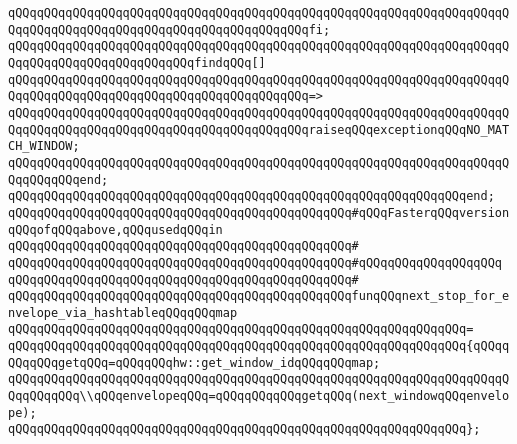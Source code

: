 \verb|qQQqqQQqqQQqqQQqqQQqqQQqqQQqqQQqqQQqqQQqqQQqqQQqqQQqqQQqqQQqqQQqqQQqqQQqqQQqqQQqqQQqqQQqqQQqqQQqqQQqqQQqqQQqqQQqfi;|\newline
\newline
\verb|qQQqqQQqqQQqqQQqqQQqqQQqqQQqqQQqqQQqqQQqqQQqqQQqqQQqqQQqqQQqqQQqqQQqqQQqqQQqqQQqqQQqqQQqqQQqqQQqfindqQQq[]|\newline
\verb|qQQqqQQqqQQqqQQqqQQqqQQqqQQqqQQqqQQqqQQqqQQqqQQqqQQqqQQqqQQqqQQqqQQqqQQqqQQqqQQqqQQqqQQqqQQqqQQqqQQqqQQqqQQqqQQq=>|\newline
\verb|qQQqqQQqqQQqqQQqqQQqqQQqqQQqqQQqqQQqqQQqqQQqqQQqqQQqqQQqqQQqqQQqqQQqqQQqqQQqqQQqqQQqqQQqqQQqqQQqqQQqqQQqqQQqqQQqraiseqQQqexceptionqQQqNO_MATCH_WINDOW;|\newline
\verb|qQQqqQQqqQQqqQQqqQQqqQQqqQQqqQQqqQQqqQQqqQQqqQQqqQQqqQQqqQQqqQQqqQQqqQQqqQQqqQQqend;|\newline
\verb|qQQqqQQqqQQqqQQqqQQqqQQqqQQqqQQqqQQqqQQqqQQqqQQqqQQqqQQqqQQqqQQqend;|\newline
\newline
\verb|qQQqqQQqqQQqqQQqqQQqqQQqqQQqqQQqqQQqqQQqqQQqqQQq#qQQqFasterqQQqversionqQQqofqQQqabove,qQQqusedqQQqin|\newline
\verb|qQQqqQQqqQQqqQQqqQQqqQQqqQQqqQQqqQQqqQQqqQQqqQQq#|\newline
\verb|qQQqqQQqqQQqqQQqqQQqqQQqqQQqqQQqqQQqqQQqqQQqqQQq#qQQqqQQqqQQqqQQqqQQq|\newline
\verb|qQQqqQQqqQQqqQQqqQQqqQQqqQQqqQQqqQQqqQQqqQQqqQQq#|\newline
\verb|qQQqqQQqqQQqqQQqqQQqqQQqqQQqqQQqqQQqqQQqqQQqqQQqfunqQQqnext_stop_for_envelope_via_hashtableqQQqqQQqmap|\newline
\verb|qQQqqQQqqQQqqQQqqQQqqQQqqQQqqQQqqQQqqQQqqQQqqQQqqQQqqQQqqQQqqQQq=|\newline
\verb|qQQqqQQqqQQqqQQqqQQqqQQqqQQqqQQqqQQqqQQqqQQqqQQqqQQqqQQqqQQqqQQq{qQQqqQQqqQQqgetqQQq=qQQqqQQqhw::get_window_idqQQqqQQqmap;|\newline
\newline
\verb|qQQqqQQqqQQqqQQqqQQqqQQqqQQqqQQqqQQqqQQqqQQqqQQqqQQqqQQqqQQqqQQqqQQqqQQqqQQqqQQq\\qQQqenvelopeqQQq=qQQqqQQqqQQqgetqQQq(next_windowqQQqenvelope);|\newline
\verb|qQQqqQQqqQQqqQQqqQQqqQQqqQQqqQQqqQQqqQQqqQQqqQQqqQQqqQQqqQQqqQQq};|\newline
\newline
